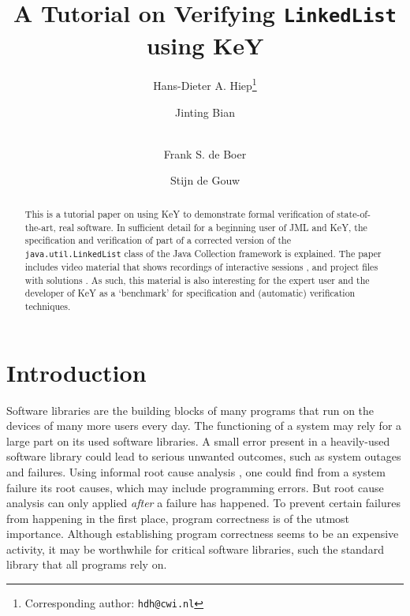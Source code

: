 \documentclass[runningheads]{llncs}
\theoremstyle{remark}
\begin{document}
\renewcommand{\thelstlisting}{\arabic{lstlisting}}

\title{A Tutorial on Verifying \texttt{LinkedList} using KeY}
\author{{Hans-Dieter} A. Hiep\footnote{Corresponding author: \texttt{hdh@cwi.nl}} \and Jinting Bian \and\\
Frank S. de Boer \and Stijn de Gouw}


\maketitle

\begin{abstract}
This is a tutorial paper on using KeY to demonstrate formal verification of state-of-the-art, real software. In sufficient detail for a beginning user of JML and KeY, the specification and verification of part of a corrected version of the \texttt{java.util.LinkedList} class of the Java Collection framework is explained. The paper includes video material that shows recordings of interactive sessions , and project files with solutions . As such, this material is also interesting for the expert user and the developer of KeY as a `benchmark' for specification and (automatic) verification techniques.
\end{abstract}


\section{Introduction}

Software libraries are the building blocks of many programs that run on the devices of many more users every day. The functioning of a system may rely for a large part on its used software libraries. A small error present in a heavily-used software library could lead to serious unwanted outcomes, such as system outages and failures. Using informal root cause analysis \cite{rooney2004root}, one could find from a system failure its root causes, which may include programming errors. But root cause analysis can only applied \emph{after} a failure has happened. To prevent certain failures from happening in the first place, program correctness is of the utmost importance. Although establishing program correctness seems to be an expensive activity, it may be worthwhile for critical software libraries, such the standard library that all programs rely on.
\end{document}
